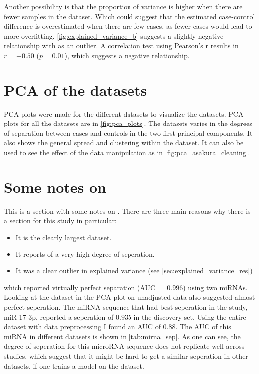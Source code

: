 Another possibility is that the proportion of variance is higher when there are fewer samples in the dataset. Which could suggest that the estimated case-control difference is overestimated when there are few cases, as fewer cases would lead to more overfitting. \autoref{fig:explained_variance_b} suggests a slightly negative relationship with \citet{Asakura2020} as an outlier. A correlation test using Pearson's r results in $r=-0.50$ ($p=0.01$), which suggests a negative relationship. 

\section{PCA of the datasets}

PCA plots were made for the different datasets to visualize the datasets. PCA plots for all the datasets are in \autoref{fig:pca_plots}. The datasets varies in the degrees of separation between cases and controls in the two first principal components. It also shows the general spread and clustering within the dataset. It can also be used to see the effect of the data manipulation as in \autoref{fig:pca_asakura_cleaning}.


\section{Some notes on \citet{Asakura2020}}

This is a section with some notes on \citet{Asakura2020}. There are three main reasons why there is a section for this study in particular:
\begin{itemize}
    \item It is the clearly largest dataset.
    \item It reports of a very high degree of seperation.
    \item It was a clear outlier in explained variance (see \autoref{sec:explained_variance_res})
\end{itemize}

\citet{Asakura2020} which reported virtually perfect separation (AUC $=0.996$) using two miRNAs. Looking at the dataset in the PCA-plot on unadjusted data also suggested almost perfect seperation. The miRNA-sequence that had best seperation in the study, miR-17-3p, reported a seperation of $0.935$ in the discovery set. Using the entire dataset with data preprocessing I found an AUC of $0.88$. The AUC of this miRNA in different datasets is shown in \autoref{tab:mirna_sep}. As one can see, the degree of seperation for this microRNA-sequence does not replicate well across studies, which suggest that it might be hard to get a similar seperation in other datasets, if one trains a model on the \citet{Asakura2020} dataset.

